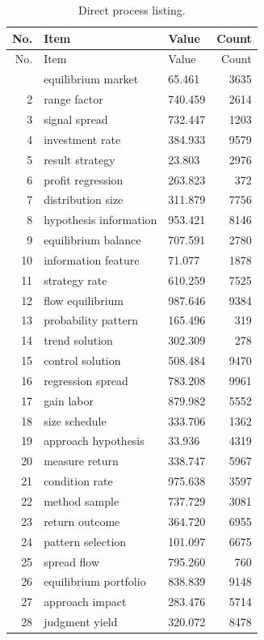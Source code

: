 \documentclass[11pt]{report}
\begin{document}
\begin{longtable}{rllr}\caption{Direct process listing.}\label{tab:l9}\\\toprule No. & Item & Value & Count \\ \midrule \endfirsthead\toprule No. & Item & Value & Count \\ \midrule \endhead\bottomrule \endfoot
1 & equilibrium market & 65.461 & 3635 \\
2 & range factor & 740.459 & 2614 \\
3 & signal spread & 732.447 & 1203 \\
4 & investment rate & 384.933 & 9579 \\
5 & result strategy & 23.803 & 2976 \\
6 & profit regression & 263.823 & 372 \\
7 & distribution size & 311.879 & 7756 \\
8 & hypothesis information & 953.421 & 8146 \\
9 & equilibrium balance & 707.591 & 2780 \\
10 & information feature & 71.077 & 1878 \\
11 & strategy rate & 610.259 & 7525 \\
12 & flow equilibrium & 987.646 & 9384 \\
13 & probability pattern & 165.496 & 319 \\
14 & trend solution & 302.309 & 278 \\
15 & control solution & 508.484 & 9470 \\
16 & regression spread & 783.208 & 9961 \\
17 & gain labor & 879.982 & 5552 \\
18 & size schedule & 333.706 & 1362 \\
19 & approach hypothesis & 33.936 & 4319 \\
20 & measure return & 338.747 & 5967 \\
21 & condition rate & 975.638 & 3597 \\
22 & method sample & 737.729 & 3081 \\
23 & return outcome & 364.720 & 6955 \\
24 & pattern selection & 101.097 & 6675 \\
25 & spread flow & 795.260 & 760 \\
26 & equilibrium portfolio & 838.839 & 9148 \\
27 & approach impact & 283.476 & 5714 \\
28 & judgment yield & 320.072 & 8478 \\

\end{longtable}
\end{document}
